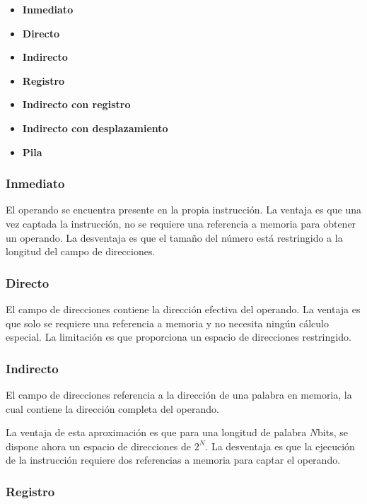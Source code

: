 \begin{itemize}
  \item \textbf{Inmediato}
  \item \textbf{Directo}
  \item \textbf{Indirecto}
  \item \textbf{Registro}
  \item \textbf{Indirecto con registro}
  \item \textbf{Indirecto con desplazamiento}
  \item \textbf{Pila}
\end{itemize}

\begin{subs}
  \subsubsection{Inmediato}
  El operando se encuentra presente en la propia instrucción. La ventaja es que una vez captada la instrucción, no se requiere una referencia a memoria para obtener un operando. La desventaja es que el tamaño del número está restringido a la longitud del campo de direcciones.

  \subsubsection{Directo}

  El campo de direcciones contiene la dirección efectiva del operando. La ventaja es que solo se requiere una referencia a memoria y no necesita ningún cálculo especial. La limitación es que proporciona un espacio de direcciones restringido.

  \subsubsection{Indirecto}

  El campo de direcciones referencia a la dirección de una palabra en memoria, la cual contiene la dirección completa del operando.

  La ventaja de esta aproximación es que para una longitud de palabra $N$bits, se dispone ahora un espacio de direcciones de $2^N$. La desventaja es que la ejecución de la instrucción requiere dos referencias a memoria para captar el operando.

  \subsubsection{Registro}


\end{subs}
